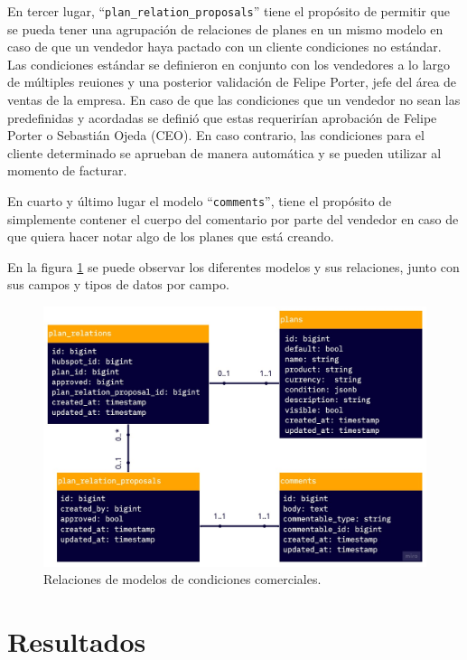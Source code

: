     En tercer lugar, ``\texttt{plan\_relation\_proposals}'' tiene el propósito de permitir que se pueda tener una agrupación de relaciones de planes en un mismo modelo en caso de que un vendedor haya pactado con un cliente condiciones no estándar. Las condiciones estándar se definieron en conjunto con los vendedores a lo largo de múltiples reuiones y una posterior validación de Felipe Porter, jefe del área de ventas de la empresa. En caso de que las condiciones que un vendedor no sean las predefinidas y acordadas se definió que estas requerirían aprobación de Felipe Porter o Sebastián Ojeda (CEO). En caso contrario, las condiciones para el cliente determinado se aprueban de manera automática y se pueden utilizar al momento de facturar.
    
    En cuarto y último lugar el modelo ``\texttt{comments}'', tiene el propósito de simplemente contener el cuerpo del comentario por parte del vendedor en caso de que quiera hacer notar algo de los planes que está creando.

    En la figura \ref{fig:cc_relations} se puede observar los diferentes modelos y sus relaciones, junto con sus campos y tipos de datos por campo.
    
    \begin{figure}
      \centering
      \includegraphics[width=0.75\linewidth]{figures/cc/cc_relations.jpg}
      \caption{Relaciones de modelos de condiciones comerciales.}
      \label{fig:cc_relations}
    \end{figure}
\section{Resultados}